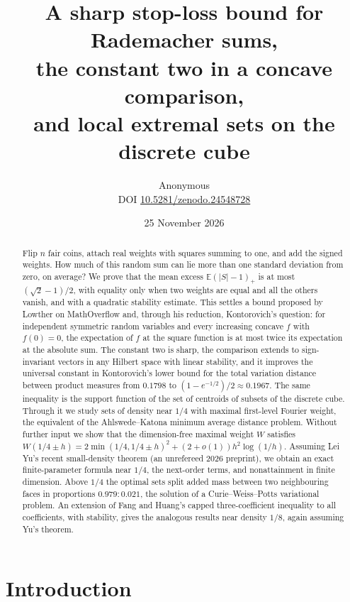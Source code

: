 \documentclass[11pt,a4paper]{article}
\title{A sharp stop-loss bound for Rademacher sums,\\ the constant two in a concave comparison,\\ and local extremal sets on the discrete cube}
\author{Anonymous\\[3pt]{\small DOI \href{https://doi.org/10.5281/zenodo.24548728}{10.5281/zenodo.24548728}}}
\date{25 November 2026}
\numberwithin{equation}{section}
\theoremstyle{remark}
\newcommand{\E}{\mathbb E}
\begin{document}
\maketitle

\begin{abstract}
Flip $n$ fair coins, attach real weights with squares summing to one, and
add the signed weights. How much of this random sum can lie more than one
standard deviation from zero, on average? We prove that the mean excess
$\E(|S|-1)_+$ is at most $(\sqrt2-1)/2$, with equality only when two weights
are equal and all the others vanish, and with a quadratic stability estimate.
This settles a bound proposed by Lowther on MathOverflow and, through his
reduction, Kontorovich's question: for independent symmetric random variables
and every increasing concave $f$ with $f(0)=0$, the expectation of $f$ at
the square function is at most twice its expectation at the absolute sum.
The constant two is sharp, the comparison extends to sign-invariant vectors in
any Hilbert space with linear stability, and it improves the universal constant
in Kontorovich's lower bound for the total variation distance between product
measures from $0.1798$ to $(1-e^{-1/2})/2\approx0.1967$.
The same inequality is the support function of the set of centroids of
subsets of the discrete cube. Through it we study sets of density near
$1/4$ with maximal first-level Fourier weight, the equivalent of the
Ahlswede--Katona minimum average distance problem. Without further
input we show that the dimension-free maximal weight $W$ satisfies
$W(1/4\pm h)=2\min(1/4,1/4\pm h)^2+(2+o(1))h^2\log(1/h)$. Assuming
Lei Yu's recent small-density theorem (an unrefereed 2026 preprint), we
obtain an exact finite-parameter formula near $1/4$, the next-order terms,
and nonattainment in finite dimension. Above $1/4$ the optimal sets split
added mass between two neighbouring faces in proportions $0.979:0.021$,
the solution of a Curie--Weiss--Potts variational problem. An extension of
Fang and Huang's capped three-coefficient inequality to all coefficients,
with stability, gives the analogous results near density $1/8$, again
assuming Yu's theorem.
\end{abstract}

\tableofcontents

\section{Introduction}\label{sec:intro}
\end{document}
